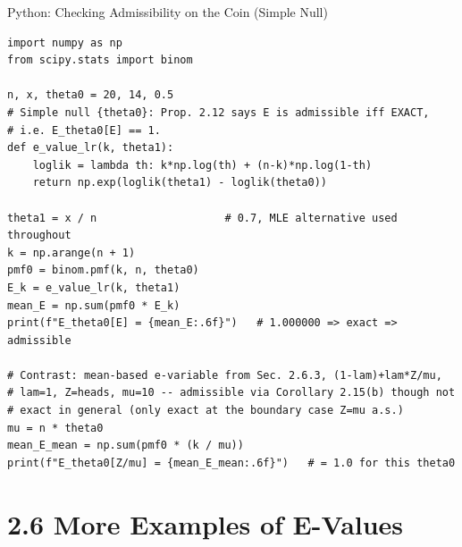 \documentclass[aspectratio=169,10pt]{beamer}
\begin{document}
\begin{frame}[fragile]{Python: Checking Admissibility on the Coin (Simple Null)}
\begin{lstlisting}[style=pycode]
import numpy as np
from scipy.stats import binom

n, x, theta0 = 20, 14, 0.5
# Simple null {theta0}: Prop. 2.12 says E is admissible iff EXACT,
# i.e. E_theta0[E] == 1.
def e_value_lr(k, theta1):
    loglik = lambda th: k*np.log(th) + (n-k)*np.log(1-th)
    return np.exp(loglik(theta1) - loglik(theta0))

theta1 = x / n                    # 0.7, MLE alternative used throughout
k = np.arange(n + 1)
pmf0 = binom.pmf(k, n, theta0)
E_k = e_value_lr(k, theta1)
mean_E = np.sum(pmf0 * E_k)
print(f"E_theta0[E] = {mean_E:.6f}")   # 1.000000 => exact => admissible

# Contrast: mean-based e-variable from Sec. 2.6.3, (1-lam)+lam*Z/mu,
# lam=1, Z=heads, mu=10 -- admissible via Corollary 2.15(b) though not
# exact in general (only exact at the boundary case Z=mu a.s.)
mu = n * theta0
mean_E_mean = np.sum(pmf0 * (k / mu))
print(f"E_theta0[Z/mu] = {mean_E_mean:.6f}")   # = 1.0 for this theta0
\end{lstlisting}
\end{frame}

\section{2.6 More Examples of E-Values}
\end{document}
